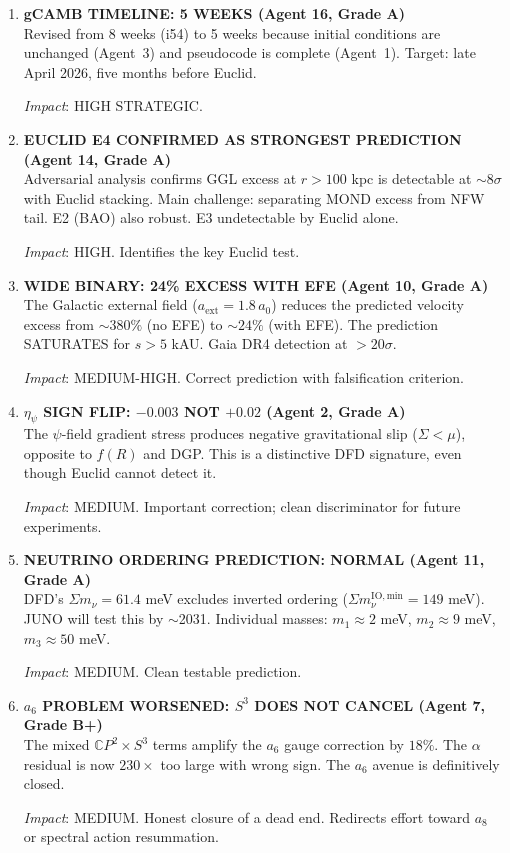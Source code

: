 \documentclass[11pt,a4paper]{article}
\newcommand{\GREEN}{\textcolor{dfdgreen}{\textbf{GREEN}}}
\newcommand{\YELLOW}{\textcolor{dfdyellow}{\textbf{YELLOW}}}
\newcommand{\CP}{\mathbb{C}P}
\begin{document}
\begin{enumerate}[label=\textbf{\arabic*.}, leftmargin=1.5cm]
\textit{Impact}: HIGH. First \GREEN\ promotion from \YELLOW\ in Wave~5.

\item \textbf{gCAMB TIMELINE: 5 WEEKS (Agent 16, Grade A)}\\
Revised from 8 weeks (i54) to 5 weeks because initial conditions are unchanged (Agent~3) and pseudocode is complete (Agent~1). Target: late April 2026, five months before Euclid.

\textit{Impact}: HIGH STRATEGIC.

\item \textbf{EUCLID E4 CONFIRMED AS STRONGEST PREDICTION (Agent 14, Grade A)}\\
Adversarial analysis confirms GGL excess at $r > 100$ kpc is detectable at $\sim 8\sigma$ with Euclid stacking. Main challenge: separating MOND excess from NFW tail. E2 (BAO) also robust. E3 undetectable by Euclid alone.

\textit{Impact}: HIGH. Identifies the key Euclid test.

\item \textbf{WIDE BINARY: 24\% EXCESS WITH EFE (Agent 10, Grade A)}\\
The Galactic external field ($a_{\mathrm{ext}} = 1.8\,a_0$) reduces the predicted velocity excess from $\sim 380\%$ (no EFE) to $\sim 24\%$ (with EFE). The prediction SATURATES for $s > 5$ kAU. Gaia DR4 detection at $> 20\sigma$.

\textit{Impact}: MEDIUM-HIGH. Correct prediction with falsification criterion.

\item \textbf{$\eta_\psi$ SIGN FLIP: $-0.003$ NOT $+0.02$ (Agent 2, Grade A)}\\
The $\psi$-field gradient stress produces negative gravitational slip ($\Sigma < \mu$), opposite to $f(R)$ and DGP. This is a distinctive DFD signature, even though Euclid cannot detect it.

\textit{Impact}: MEDIUM. Important correction; clean discriminator for future experiments.

\item \textbf{NEUTRINO ORDERING PREDICTION: NORMAL (Agent 11, Grade A)}\\
DFD's $\Sigma m_\nu = 61.4$ meV excludes inverted ordering ($\Sigma m_\nu^{\mathrm{IO,min}} = 149$ meV). JUNO will test this by $\sim$2031. Individual masses: $m_1 \approx 2$ meV, $m_2 \approx 9$ meV, $m_3 \approx 50$ meV.

\textit{Impact}: MEDIUM. Clean testable prediction.

\item \textbf{$a_6$ PROBLEM WORSENED: $S^3$ DOES NOT CANCEL (Agent 7, Grade B+)}\\
The mixed $\CP^2 \times S^3$ terms amplify the $a_6$ gauge correction by $18\%$. The $\alpha$ residual is now $230\times$ too large with wrong sign. The $a_6$ avenue is definitively closed.

\textit{Impact}: MEDIUM. Honest closure of a dead end. Redirects effort toward $a_8$ or spectral action resummation.
\end{enumerate}
\end{document}
